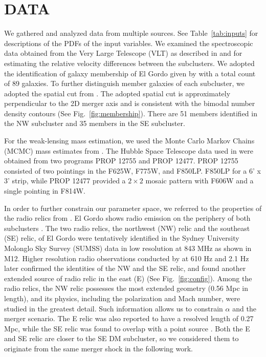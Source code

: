 \documentclass[letterpaper,useAMS,usenatbib]{mn2e}
\begin{document}
\section{DATA} 
We gathered and analyzed data from multiple sources. 
See Table~\ref{tab:inputs} for descriptions of the PDFs of the input
variables. 
We examined the
spectroscopic data obtained from the Very Large Telescope (VLT) as described in  and \citet{Sifon13} for estimating the
relative velocity differences between the subclusters.
We adopted the identification of galaxy membership of El Gordo given by
\citet{Sifon13} with a total count of 89 galaxies.
To further distinguish member galaxies of each subcluster, we adopted the
spatial cut from .
The adopted spatial cut is approximately perpendicular to the 2D merger
axis  and is consistent with
the bimodal number density contours (See Fig.~\ref{fig:membership}). 
There are 51 members identified in the NW subcluster and 35 members in the SE
subcluster. \par 
For the weak-lensing mass estimation, we used the
Monte Carlo Markov Chains (MCMC) mass estimates from .
The Hubble Space Telescope data used in  were obtained from two
programs PROP 12755 and PROP 12477. PROP 12755 consisted of two pointings in the F625W, F775W, and F850LP.
F850LP for a 6' x 3' strip, while PROP 12477 provided a $2 \times 2$ mosaic
pattern with F606W and a single pointing in F814W. 
\par 
In order to further constrain our parameter space, we referred to the properties of
the radio relics from \citet{L13}. El Gordo shows radio emission on the
periphery of both subclusters . The two radio relics, the
northwest (NW) relic and the southeast (SE) relic, of El Gordo were
tentatively identified
in the Sydney University Molonglo Sky Survey (SUMSS) data in low
resolution at 843 MHz \citep{Mauch03} as shown in M12. Higher
resolution radio observations conducted by \cite{L13} at 610 \mega Hz and
2.1 \giga Hz later confirmed the identities of the NW and the SE relic, and
found another extended source of radio relic in the east (E) (See Fig.~\ref{fig:config}). Among the radio relics, the NW relic possesses the most extended geometry
(0.56 Mpc in length), and its physics, including the
polarization and Mach number, were studied in the greatest detail. Such
information allows us to constrain $\alpha$ and the merger scenario. The E relic
was also reported to have a resolved length of 0.27 Mpc, while the SE relic
was found to overlap with a point source \citep{L13}. Both the E and SE
relic are closer to the SE DM subcluster, so we considered them to
originate from the same merger shock in the following work.
\end{document}
